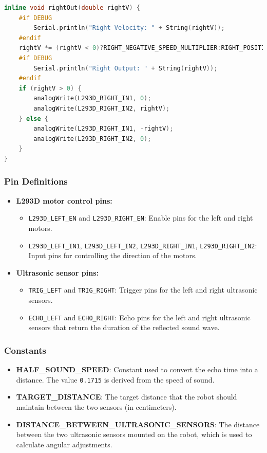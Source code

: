 \documentclass[a4paper,12pt]{article}
\begin{document}
\begin{lstlising}[language=C++]
\begin{lstlisting}[language=C++]
inline void rightOut(double rightV) {
    #if DEBUG
        Serial.println("Right Velocity: " + String(rightV));
    #endif
    rightV *= (rightV < 0)?RIGHT_NEGATIVE_SPEED_MULTIPLIER:RIGHT_POSITIVE_SPEED_MULTIPLIER;
    #if DEBUG
        Serial.println("Right Output: " + String(rightV));
    #endif
    if (rightV > 0) {
        analogWrite(L293D_RIGHT_IN1, 0);
        analogWrite(L293D_RIGHT_IN2, rightV);
    } else {
        analogWrite(L293D_RIGHT_IN1, -rightV);
        analogWrite(L293D_RIGHT_IN2, 0);
    }
}
\end{lstlisting}
\subsubsection{Pin Definitions}
\begin{itemize}
\item \textbf{L293D motor control pins:}
\begin{itemize}
\item \texttt{L293D\_LEFT\_EN} and \texttt{L293D\_RIGHT\_EN}: Enable pins for the left and right motors.
\item \texttt{L293D\_LEFT\_IN1}, \texttt{L293D\_LEFT\_IN2}, \texttt{L293D\_RIGHT\_IN1}, \texttt{L293D\_RIGHT\_IN2}: Input pins for controlling the direction of the motors.
\end{itemize}
\item \textbf{Ultrasonic sensor pins:}
\begin{itemize}
\item \texttt{TRIG\_LEFT} and \texttt{TRIG\_RIGHT}: Trigger pins for the left and right ultrasonic sensors.
\item \texttt{ECHO\_LEFT} and \texttt{ECHO\_RIGHT}: Echo pins for the left and right ultrasonic sensors that return the duration of the reflected sound wave.
\end{itemize}
\end{itemize}
\subsubsection{Constants}
\begin{itemize}
\item \textbf{HALF\_SOUND\_SPEED}: Constant used to convert the echo time into a distance. The value \texttt{0.1715} is derived from the speed of sound.
\item \textbf{TARGET\_DISTANCE}: The target distance that the robot should maintain between the two sensors (in centimeters).
\item \textbf{DISTANCE\_BETWEEN\_ULTRASONIC\_SENSORS}: The distance between the two ultrasonic sensors mounted on the robot, which is used to calculate angular adjustments.
\end{itemize}

\end{lstlising}
\end{document}
